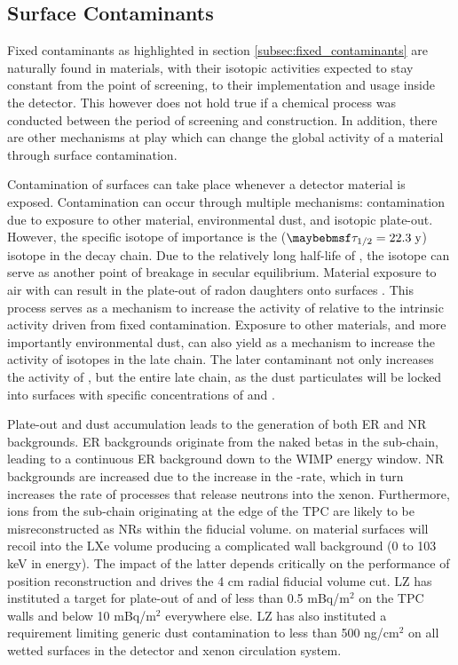 \subsection{Surface Contaminants}
\label{subsec:surface_contaminants}

Fixed contaminants as highlighted in section \ref{subsec:fixed_contaminants} are naturally found in materials, with their isotopic activities expected to stay constant from the point of screening, to their implementation and usage inside the detector. This however does not hold true if a chemical process was conducted between the period of screening and construction. In addition, there are other mechanisms at play which can change the global activity of a material through surface contamination.

Contamination of surfaces can take place whenever a detector material is exposed. Contamination can occur through multiple mechanisms: contamination due to exposure to other material, environmental dust, and isotopic plate-out. However, the specific isotope of importance is the \PbTOZ{} ($\tau_{1/2} = 22.3 \; \MathText{y}$) isotope in the \UTTE{} decay chain. Due to the relatively long half-life of \PbTOZ{}, the isotope can serve as another point of breakage in secular equilibrium. Material exposure to air with \RnTTT{} can result in the plate-out of radon daughters onto surfaces \cite{Bruemmer_2015, Stein_2018}. This process serves as a mechanism to increase the activity of \PbTOZ{} relative to the intrinsic activity driven from fixed contamination. Exposure to other materials, and more importantly environmental dust, can also yield as a mechanism to increase the activity of isotopes in the late chain. The later contaminant not only increases the activity of \PbTOZ{}, but the entire late chain, as the dust particulates will be locked into surfaces with specific concentrations of \UTTE{} and \ThTTT{}.

Plate-out and dust accumulation leads to the generation of both ER and NR backgrounds. ER backgrounds originate from the \PbTOF{} naked betas in the \RnTTT{} sub-chain, leading to a continuous ER background down to the WIMP energy window. NR backgrounds are increased due to the increase in the \alpha-rate, which in turn increases the rate of \alphaN{} processes that release neutrons into the xenon. Furthermore, \PoTOZ{} ions from the \PbTOZ{} sub-chain originating at the edge of the TPC are likely to be misreconstructed as NRs within the fiducial volume. \PoTOZ{} on material surfaces will recoil into the LXe volume producing a complicated wall background (0 to 103 keV in energy). The impact of the latter depends critically on the performance of position reconstruction and drives the 4 cm radial fiducial volume cut. LZ has instituted a target for plate-out of \PbTOZ{} and \PoTOZ{} of less than 0.5 mBq/m$^{2}$ on the TPC walls and below 10 mBq/m$^{2}$ everywhere else. LZ has also instituted a requirement limiting generic dust contamination to less than 500 ng/cm$^{2}$ on all wetted surfaces in the detector and xenon circulation system. 

